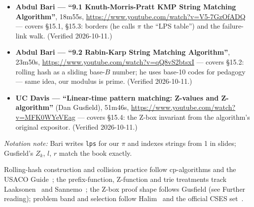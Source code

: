 \begin{rulebox}
\begin{itemize}
\item \textbf{Abdul Bari --- ``9.1 Knuth-Morris-Pratt KMP String
Matching Algorithm''}, 18m55s,
\url{https://www.youtube.com/watch?v=V5-7GzOfADQ} --- covers
\S15.1, \S15.3: borders (he calls $\pi$ the ``LPS table'') and
the failure-link walk. (Verified 2026-10-11.)
\item \textbf{Abdul Bari --- ``9.2 Rabin-Karp String Matching
Algorithm''}, 23m50s,
\url{https://www.youtube.com/watch?v=qQ8vS2btsxI} --- covers
\S15.2: rolling hash as a sliding base-$B$ number; he uses
base-10 codes for pedagogy --- same idea, our modulus is prime.
(Verified 2026-10-11.)
\item \textbf{UC Davis --- ``Linear-time pattern matching:
Z-values and Z-algorithm''} (Dan Gusfield), 51m46s,
\url{https://www.youtube.com/watch?v=MFK0WYeVEag} --- covers
\S15.4: the Z-box invariant from the algorithm's original
expositor. (Verified 2026-10-11.)
\end{itemize}
\emph{Notation note:} Bari writes \texttt{lps} for our $\pi$ and
indexes strings from 1 in slides; Gusfield's $Z_k$, $l$, $r$
match the book exactly.
\end{rulebox}
Rolling-hash construction and collision practice follow
cp-algorithms and the USACO Guide~\cite{cpalgorithms,usacoguide};
the prefix-function, Z-function and trie treatments track
Laaksonen~\cite{laaksonen2024} and Sannemo~\cite{sannemo2025};
the Z-box proof shape follows Gusfield (see Further reading);
problem band and selection follow Halim~\cite{halimcp4} and the
official CSES set~\cite{cses}.
